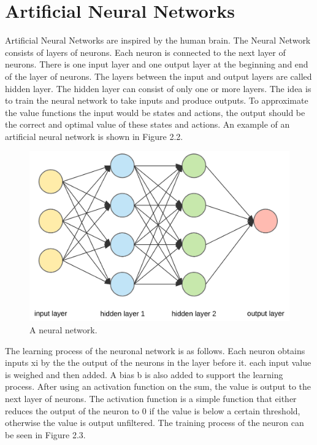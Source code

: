 
\section{Artificial Neural Networks}

Artificial Neural Networks are inspired by the human brain. 
The Neural Network consists of layers of neurons. Each neuron is connected to the next layer of neurons. There is one input layer and one output layer at the beginning and end of the layer of neurons. The layers between the input and output layers are called hidden layer. The hidden layer can consist of only one or more layers. The idea is to train the neural network to take inputs and produce outputs. To approximate the value functions the input would be states and actions, the output should be the correct and optimal value of these states and actions. An example of an artificial neural network is shown in Figure 2.2.

\begin{figure} [h]
	
	\centering
	\includegraphics[width=1\textwidth]{figures/neural_network.png}
	\caption{A neural network. %
	}
\end{figure}

\vspace{0.5cm}

The learning process of the neuronal network is as follows. Each neuron obtains inputs xi by the the output of the neurons in the layer before it. each input value is weighed and then added. A bias b is also added to support the learning process. After using an activation function on the sum, the value is output to the next layer of neurons. The activation function is a simple function that either reduces the output of the neuron to 0 if the value is below a certain threshold, otherwise the value is output unfiltered.
The training process of the neuron can be seen in Figure 2.3.

